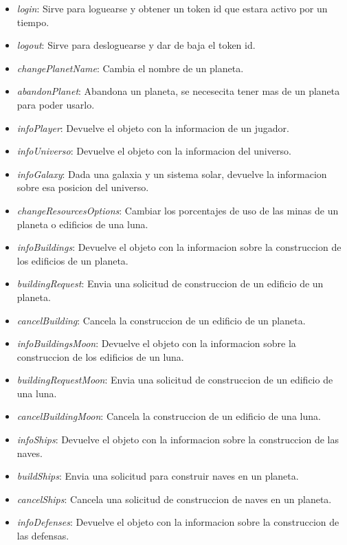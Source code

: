 \documentclass{article}
\begin{document}
\begin{itemize}[noitemsep]
    \item \textit{login}: Sirve para loguearse y obtener un token id que estara activo por un tiempo.
    \item \textit{logout}: Sirve para desloguearse y dar de baja el token id.
    \item \textit{changePlanetName}: Cambia el nombre de un planeta.
    \item \textit{abandonPlanet}: Abandona un planeta, se necesecita tener mas de un planeta para poder usarlo.
    \item \textit{infoPlayer}: Devuelve el objeto con la informacion de un jugador.
    \item \textit{infoUniverso}: Devuelve el objeto con la informacion del universo.
    \item \textit{infoGalaxy}: Dada una galaxia y un sistema solar, devuelve la informacion sobre esa posicion del universo.
    \item \textit{changeResourcesOptions}: Cambiar los porcentajes de uso de las minas de un planeta o edificios de una luna.
    \item \textit{infoBuildings}: Devuelve el objeto con la informacion sobre la construccion de los edificios de un planeta.
    \item \textit{buildingRequest}: Envia una solicitud de construccion de un edificio de un planeta.
    \item \textit{cancelBuilding}: Cancela la construccion de un edificio de un planeta.
    \item \textit{infoBuildingsMoon}: Devuelve el objeto con la informacion sobre la construccion de los edificios de un luna.
    \item \textit{buildingRequestMoon}: Envia una solicitud de construccion de un edificio de una luna.
    \item \textit{cancelBuildingMoon}: Cancela la construccion de un edificio de una luna.
    \item \textit{infoShips}: Devuelve el objeto con la informacion sobre la construccion de las naves.
    \item \textit{buildShips}: Envia una solicitud para construir naves en un planeta.
    \item \textit{cancelShips}: Cancela una solicitud de construccion de naves en un planeta.
    \item \textit{infoDefenses}: Devuelve el objeto con la informacion sobre la construccion de las defensas.

\end{itemize}
\end{document}
